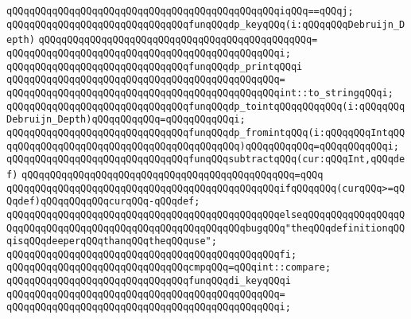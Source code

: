 \verb|qQQqqQQqqQQqqQQqqQQqqQQqqQQqqQQqqQQqqQQqqQQqqQQqiqQQq==qQQqj;|\newline
\newline
\verb|qQQqqQQqqQQqqQQqqQQqqQQqqQQqqQQqfunqQQqdp_keyqQQq(i:qQQqqQQqDebruijn_Depth)|\newline
\verb|qQQqqQQqqQQqqQQqqQQqqQQqqQQqqQQqqQQqqQQqqQQqqQQq=|\newline
\verb|qQQqqQQqqQQqqQQqqQQqqQQqqQQqqQQqqQQqqQQqqQQqqQQqi;|\newline
\newline
\verb|qQQqqQQqqQQqqQQqqQQqqQQqqQQqqQQqfunqQQqdp_printqQQqi|\newline
\verb|qQQqqQQqqQQqqQQqqQQqqQQqqQQqqQQqqQQqqQQqqQQqqQQq=|\newline
\verb|qQQqqQQqqQQqqQQqqQQqqQQqqQQqqQQqqQQqqQQqqQQqqQQqint::to_stringqQQqi;|\newline
\newline
\verb|qQQqqQQqqQQqqQQqqQQqqQQqqQQqqQQqfunqQQqdp_tointqQQqqQQqqQQq(i:qQQqqQQqDebruijn_Depth)qQQqqQQqqQQq=qQQqqQQqqQQqi;|\newline
\verb|qQQqqQQqqQQqqQQqqQQqqQQqqQQqqQQqfunqQQqdp_fromintqQQq(i:qQQqqQQqIntqQQqqQQqqQQqqQQqqQQqqQQqqQQqqQQqqQQqqQQqqQQq)qQQqqQQqqQQq=qQQqqQQqqQQqi;|\newline
\newline
\verb|qQQqqQQqqQQqqQQqqQQqqQQqqQQqqQQqfunqQQqsubtractqQQq(cur:qQQqInt,qQQqdef)|\newline
\verb|qQQqqQQqqQQqqQQqqQQqqQQqqQQqqQQqqQQqqQQqqQQqqQQq=qQQq|\newline
\verb|qQQqqQQqqQQqqQQqqQQqqQQqqQQqqQQqqQQqqQQqqQQqqQQqifqQQqqQQq(curqQQq>=qQQqdef)qQQqqQQqqQQqcurqQQq-qQQqdef;|\newline
\verb|qQQqqQQqqQQqqQQqqQQqqQQqqQQqqQQqqQQqqQQqqQQqqQQqelseqQQqqQQqqQQqqQQqqQQqqQQqqQQqqQQqqQQqqQQqqQQqqQQqqQQqqQQqqQQqbugqQQq"theqQQqdefinitionqQQqisqQQqdeeperqQQqthanqQQqtheqQQquse";|\newline
\verb|qQQqqQQqqQQqqQQqqQQqqQQqqQQqqQQqqQQqqQQqqQQqqQQqfi;|\newline
\newline
\verb|qQQqqQQqqQQqqQQqqQQqqQQqqQQqqQQqcmpqQQq=qQQqint::compare;|\newline
\newline
\verb|qQQqqQQqqQQqqQQqqQQqqQQqqQQqqQQqfunqQQqdi_keyqQQqi|\newline
\verb|qQQqqQQqqQQqqQQqqQQqqQQqqQQqqQQqqQQqqQQqqQQqqQQq=|\newline
\verb|qQQqqQQqqQQqqQQqqQQqqQQqqQQqqQQqqQQqqQQqqQQqqQQqi;|\newline
